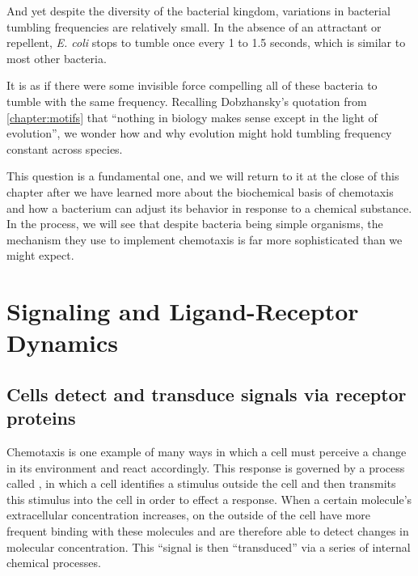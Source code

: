 And yet despite the diversity of the bacterial kingdom, variations in bacterial tumbling frequencies are relatively small. In the absence of an attractant or repellent, \textit{E. coli} stops to tumble once every 1 to 1.5 seconds, which is similar to most other bacteria.

It is as if there were some invisible force compelling all of these bacteria to tumble with the same frequency. Recalling Dobzhansky's quotation from \autoref{chapter:motifs} that ``nothing in biology makes sense except in the light of evolution'', we wonder how and why evolution might hold tumbling frequency constant across species.

This question is a fundamental one, and we will return to it at the close of this chapter after we have learned more about the biochemical basis of chemotaxis and how a bacterium can adjust its behavior in response to a chemical substance. In the process, we will see that despite bacteria being simple organisms, the mechanism they use to implement chemotaxis is far more sophisticated than we might expect.\\

\begin{qbox}\end{qbox}


\FloatBarrier
{}
\section{Signaling and Ligand-Receptor Dynamics}
\label{sec:signal}

\subsection{Cells detect and transduce signals via receptor proteins}

Chemotaxis is one example of many ways in which a cell must perceive a change in its environment and react accordingly. This response is governed by a process called , in which a cell identifies a stimulus outside the cell and then transmits this stimulus into the cell in order to effect a response. When a certain molecule's extracellular concentration increases,  on the outside of the cell have more frequent binding with these molecules and are therefore able to detect changes in molecular concentration. This ``signal is then ``transduced'' via a series of internal chemical processes.

